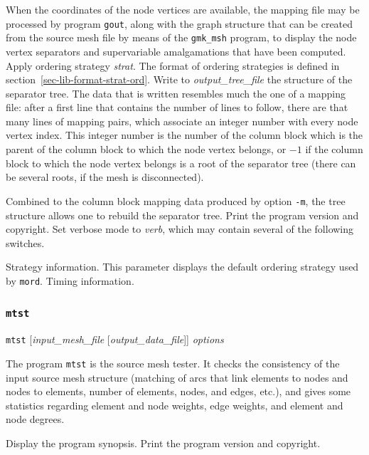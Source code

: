 \begin{itemize}
\begin{itemize}
When the coordinates of the node vertices are available, the mapping
file may be processed by program \texttt{gout}, along with the graph
structure that can be created from the source mesh file by means of
the \texttt{gmk\_\lbt msh} program, to display the node vertex separators
and supervariable amalgamations that have been computed.
Apply ordering strategy {\it strat}. The format of ordering
strategies is defined in section~\ref{sec-lib-format-strat-ord}.
Write to {\it output\_tree\_file\/} the structure of the separator
tree. The data that is written resembles much the one of a mapping
file: after a first line that contains the number of lines to follow,
there are that many lines of mapping pairs, which associate an integer
number with every node vertex index. This integer number is the
number of the column block which is the parent of the column block to
which the node vertex belongs, or $-1$ if the column block to which the
node vertex belongs is a root of the separator tree (there can be
several roots, if the mesh is disconnected).

Combined to the column block mapping data produced by option \texttt{-m},
the tree structure allows one to rebuild the separator tree.
\iteme[\texttt{-V}]
Print the program version and copyright.
Set verbose mode to {\it verb}, which may contain several of the following
switches.
\begin{itemize}
\iteme[\texttt{s}]
Strategy information. This parameter displays the default ordering
strategy used by \texttt{mord}.
\iteme[\texttt{t}]
Timing information.
\end{itemize}
\end{itemize}
\end{itemize}

\subsubsection{\texttt{mtst}}

\begin{itemize}
\progsyn
\texttt{mtst} [{\it input\_mesh\_file} [{\it output\_data\_file}]] {\it options}

\progdes
The program \texttt{mtst} is the source mesh tester. It checks the
consistency of the input source mesh structure (matching of arcs
that link elements to nodes and nodes to elements, number of elements,
nodes, and edges, etc\@.), and gives some statistics regarding element
and node weights, edge weights, and element and node degrees.

\progopt
\begin{itemize}
\iteme[\texttt{-h}]
Display the program synopsis.
\iteme[\texttt{-V}]
Print the program version and copyright.
\end{itemize}
\end{itemize}
